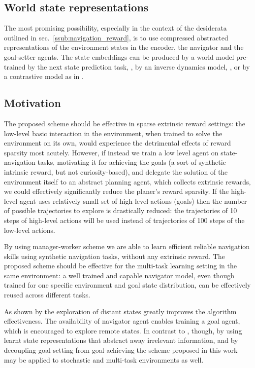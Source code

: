 \documentclass[acmsmall, nonacm]{acmart}
\begin{document}
\subsection{World state representations}

The most promising possibility, especially in the context of the desiderata outlined in sec.~\ref{ssub:navigation_reward}, is to use compressed abstracted representations of the environment states in the encoder, the navigator and the goal-setter agents. The state embeddings can be produced by a world model pre-trained by the next state prediction task, \citep{ha_recurrent_2018}, by an inverse dynamics model, \citep{badia_never_2020}, or by a contrastive model as in \citep{Ugadiarov2021LongTermEI}.

\subsection{Motivation}

The proposed scheme should be effective in sparse extrinsic reward settings: the low-level basic interaction in the environment, when trained to solve the environment on its own, would experience the detrimental effects of reward sparsity most acutely. However, if instead we train a low level agent on state-navigation tasks, motivating it for achieving the goals (a sort of synthetic intrinsic reward, but not curiosity-based), and delegate the solution of the environment itself to an abstract planning agent, which collects extrinsic rewards, we could effectively significantly reduce the planer's reward sparsity. If the high-level agent uses relatively small set of high-level actions (goals) then the number of possible trajectories to explore is drastically reduced: the trajectories of 10 steps of high-level actions will be used instead of trajectories of 100 steps of the low-level actions.

By using manager-worker scheme we are able to learn efficient reliable navigation skills using synthetic navigation tasks, 
without any extrinsic reward.
%
The proposed scheme should be effective for the multi-task learning setting in the same environment: a well trained and capable navigator model, even though trained for one specific environment and goal state distribution, can be effectively reused across different tasks.

As shown by \citet{ecoffet_first_2021} the exploration of distant states greatly improves the algorithm effectiveness. The availability of navigator agent enables training a goal agent, which is encouraged to explore remote states.
%
In contrast to \citep{ecoffet_first_2021}, though, by using learnt state representations that abstract away irrelevant information, and by decoupling goal-setting from goal-achieving the scheme proposed in this work may be applied to stochastic and multi-task environments as well.
\end{document}

